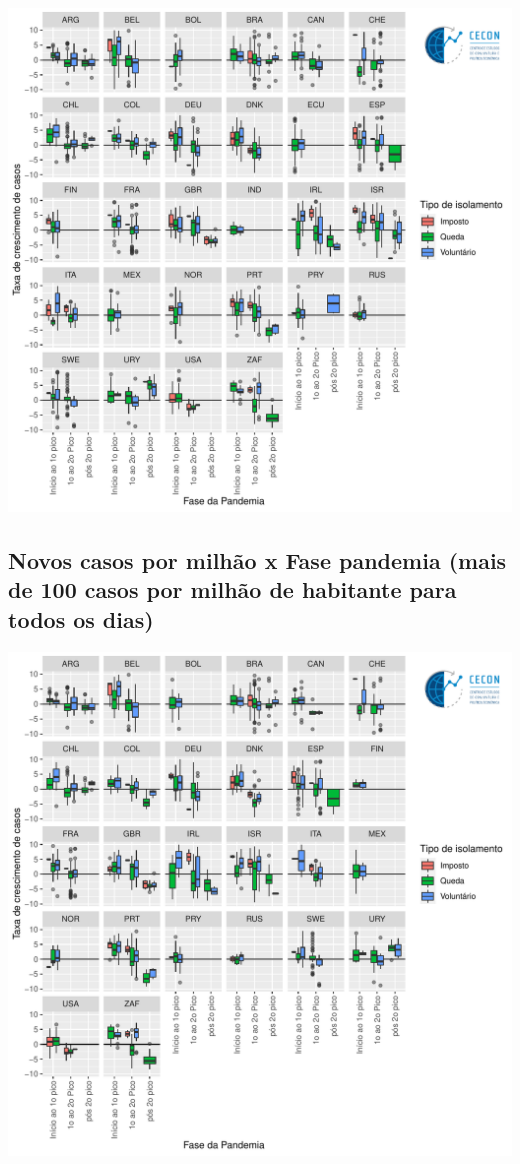 \documentclass{SelfArx}
\begin{document}
\begin{center}
\includegraphics[width=.9\linewidth]{./figs/COVID/Casos_Policy_50_Todos.pdf}
\end{center}

\subsection*{Novos casos por milhão x Fase pandemia (mais de 100 casos por milhão de habitante para todos os dias)}
\label{sec:org45bb0b9}

\begin{center}
\includegraphics[width=.9\linewidth]{./figs/COVID/Casos_Policy_100_Todos.pdf}
\end{center}
\end{document}
